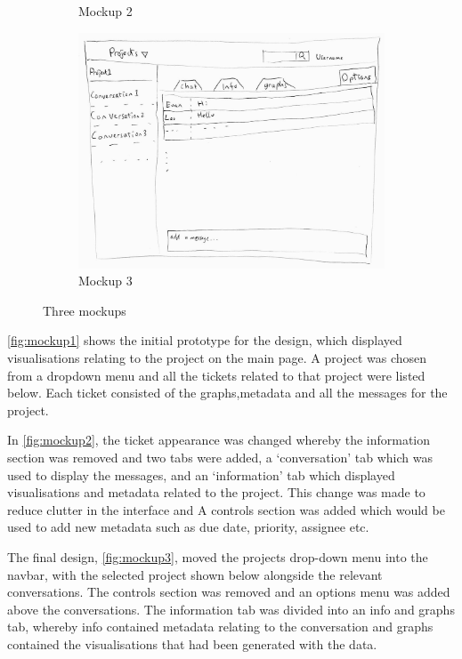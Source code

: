 \documentclass[a4paper]{l3proj}
\begin{document}
\begin{figure}
\begin{subfigure}[b]{0.3\textwidth}
		\caption{Mockup 2}
		\label{fig:mockup2} 
    \end{subfigure}
    \hfill
    \begin{subfigure}[b]{0.3\textwidth}
        \centering
		\includegraphics[width=\textwidth]{mockup3}
		\caption{Mockup 3}
		\label{fig:mockup3} 
    \end{subfigure}
    \caption{Three mockups}
    \label{fig:Three mockups}
\end{figure}

\autoref{fig:mockup1} shows the initial prototype for the design, which displayed visualisations relating to the project on the main page.  A project was chosen from a dropdown menu and all the tickets related to that project were listed below.  Each ticket consisted of the graphs,metadata and all the messages for the project.

In \autoref{fig:mockup2}, the ticket appearance was changed whereby the information section was removed and two tabs were added, a ‘conversation’ tab which was used to display the messages, and an ‘information’ tab which displayed visualisations and metadata related to the project. This change was made to reduce clutter in the interface and  A controls section was added which would be used to add new metadata such as due date, priority, assignee etc.

The final design, \autoref{fig:mockup3}, moved the projects drop-down menu into the navbar, with the selected project shown below alongside the relevant conversations.  The controls section was removed and an options menu was added above the conversations.  The information tab was divided into an info and graphs tab, whereby info contained metadata relating to the conversation and graphs contained the visualisations that had been generated with the data.
\end{document}
